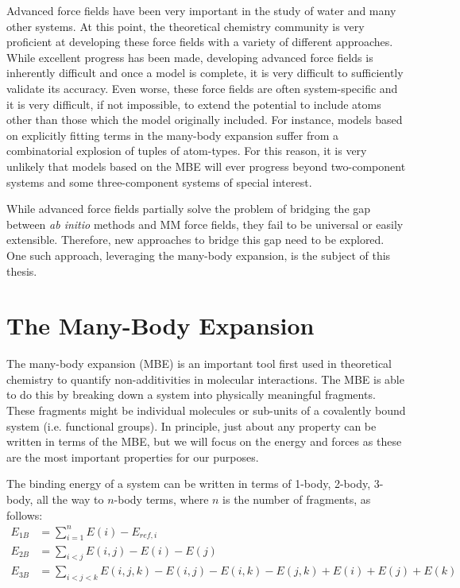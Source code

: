 \documentclass[11pt, proquest]{uwthesis}[2020/02/24]
\begin{document}
\par Advanced force fields have been very important in the study of water and many other systems. At this point, the theoretical chemistry community is very proficient at developing these force fields with a variety of different approaches. While excellent progress has been made, developing advanced force fields is inherently difficult and once a model is complete, it is very difficult to sufficiently validate its accuracy. Even worse, these force fields are often system-specific and it is very difficult, if not impossible, to extend the potential to include atoms other than those which the model originally included. For instance, models based on explicitly fitting terms in the many-body expansion suffer from a combinatorial explosion of tuples of atom-types. For this reason, it is very unlikely that models based on the MBE will ever progress beyond two-component systems and some three-component systems of special interest.

\par While advanced force fields partially solve the problem of bridging the gap between \textit{ab initio} methods and MM force fields, they fail to be universal or easily extensible. Therefore, new approaches to bridge this gap need to be explored. One such approach, leveraging the many-body expansion, is the subject of this thesis.

\chapter{The Many-Body Expansion}

\par The many-body expansion (MBE) is an important tool first used in theoretical chemistry to quantify non-additivities in molecular interactions.\autocite{hankins_hydrogen-bond_1970} The MBE is able to do this by breaking down a system into physically meaningful fragments. These fragments might be individual molecules or sub-units of a covalently bound system (i.e. functional groups). In principle, just about any property can be written in terms of the MBE, but we will focus on the energy and forces as these are the most important properties for our purposes.

\par The binding energy of a system can be written in terms of 1-body, 2-body, 3-body, all the way to $n$-body terms, where $n$ is the number of fragments, as follows:
\begin{align}
    E_{1B} &= \sum_{i=1}^nE(i)-E_{ref,i} \\
    E_{2B} &= \sum_{i<j}E(i,j)-E(i)-E(j) \\
    E_{3B} &= \sum_{i<j<k} E(i,j,k)-E(i,j)-E(i,k)-E(j,k)+E(i)+E(j)+E(k)
\end{align}
\end{document}
